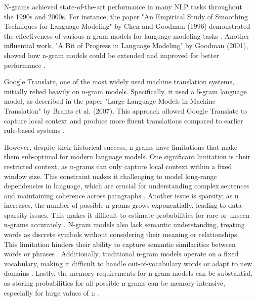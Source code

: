 \documentclass[a4paper, oneside]{discothesis}
\begin{document}
N-grams achieved state-of-the-art performance in many NLP tasks throughout the 1990s and 2000s. For instance, the paper "An Empirical Study of Smoothing Techniques for Language Modeling" by Chen and Goodman (1996) demonstrated the effectiveness of various n-gram models for language modeling tasks \cite{chen1996empirical}. Another influential work, "A Bit of Progress in Language Modeling" by Goodman (2001), showed how n-gram models could be extended and improved for better performance \cite{goodman2001bit}.

Google Translate, one of the most widely used machine translation systems, initially relied heavily on n-gram models. Specifically, it used a 5-gram language model, as described in the paper "Large Language Models in Machine Translation" by Brants et al. (2007). This approach allowed Google Translate to capture local context and produce more fluent translations compared to earlier rule-based systems \cite{brants2007large}.

However, despite their historical success, n-grams have limitations that make them sub-optimal for modern language models. One significant limitation is their restricted context, as n-grams can only capture local context within a fixed window size. This constraint makes it challenging to model long-range dependencies in language, which are crucial for understanding complex sentences and maintaining coherence across paragraphs \cite{bengio2003neural}. Another issue is sparsity; as n increases, the number of possible n-grams grows exponentially, leading to data sparsity issues. This makes it difficult to estimate probabilities for rare or unseen n-grams accurately \cite{katz1987estimation}. N-gram models also lack semantic understanding, treating words as discrete symbols without considering their meaning or relationships. This limitation hinders their ability to capture semantic similarities between words or phrases \cite{mikolov2013distributed}. Additionally, traditional n-gram models operate on a fixed vocabulary, making it difficult to handle out-of-vocabulary words or adapt to new domains \cite{jelinek1980interpolated}. Lastly, the memory requirements for n-gram models can be substantial, as storing probabilities for all possible n-grams can be memory-intensive, especially for large values of n \cite{heafield2011kenlm}.
\end{document}
